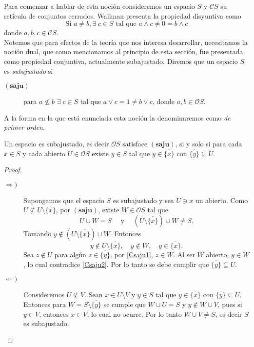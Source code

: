 \documentclass{comunicaciones}
\begin{document}
Para comenzar a hablar de esta noción consideremos un espacio $S$ y $\mathcal{C}S$ su retícula de conjuntos cerrados. Wallman presenta la propiedad disyuntiva como
\[
\mbox{Si }a\neq b, \exists\; c\in S \mbox{ tal que }a\wedge c\neq 0=b\wedge c
\]
donde $a, b, c\in \mathcal{C}S$.\\

Notemos que para efectos de la teoría que nos interesa desarrollar, necesitamos la noción dual, que como mencionamos al principio de esta sección, fue presentada como propiedad conjuntiva, actualmente subajustado. Diremos que un espacio $S$ es \emph{subajustado} si

\begin{description}
    \item[$(\mathbf{saju})$] para $a\nleq b$ $\exists\; c\in S$ tal que $a\vee c=1\neq b\vee c$, donde $a,b\in \mathcal{O}S$.
\end{description}
A la forma en la que está enunciada esta noción la denominaremos como \emph{de primer orden}.

\begin{thm}\label{Saju1}
    Un espacio es subajustado, es decir $\mathcal{O}S$ satisface $(\mathbf{saju})$, si y solo si para cada $x\in S$ y cada abierto $U\in \mathcal{O}S$ existe $y\in S$ tal que $y\in \overline{\{x\}}$ con $\overline{\{y\}}\subseteq U$.
\end{thm}

\begin{proof}
    \begin{description}
        \item[$\Rightarrow )$] Supongamos que el espacio $S$ es subajustado y sea $U\ni x$ un abierto. Como $U\nsubseteq U\setminus \overline{\{x\}}$, por $(\mathbf{saju})$, existe $W\in \mathcal{O}S$ tal que 
        \begin{equation}\label{Csaju1}
            U\cup W=S \quad\mbox{ y }\quad(U\setminus\overline{\{x\}})\cup W\neq S.
        \end{equation}
        Tomando $y\notin (U\setminus\overline{\{x\}})\cup W$. Entonces 
        \begin{equation}\label{Csaju2}
            y\notin U\setminus\overline{\{x\}}, \quad y\notin W, \quad y\in \overline{\{x\}}.
        \end{equation}
        Sea $z\notin U$ para algún $z\in \overline{\{y\}}$, por \ref{Csaju1}, $z\in W$. Al ser $W$ abierto, $y\in W$, lo cual contradice \ref{Csaju2}. Por lo tanto se debe cumplir que $\overline{\{y\}}\subseteq U$.
        \item[$\Leftarrow )$] Consideremos $U\nsubseteq V$.  Sean $x\in U\setminus V$ y $y\in S$ tal que $y\in \overline{\{x\}}$ con $\overline{\{y\}}\subseteq U$. Entonces para $W=S\setminus \overline{\{y\}}$ se cumple que $W\cup U=S$ y $y\notin W\cup V$, pues si $y\in V$, entonces $x\in V$, lo cual no ocurre. Por lo tanto $W\cup V\neq S$, es decir $S$ es subajustado.
    \end{description}
\end{proof}
\end{document}
